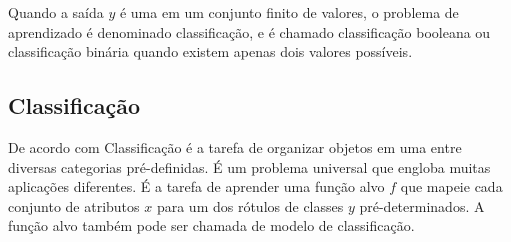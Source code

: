 Quando a saída \(y\) é uma em um conjunto finito de valores, o problema de
aprendizado é denominado classificação, e é chamado classificação booleana ou
classificação binária quando existem apenas dois valores
possíveis\cite{russell2011artificial}.

\subsection{Classificação}

De acordo com  Classificação é a tarefa de
organizar objetos em uma entre diversas categorias pré-definidas. É um problema
universal que engloba muitas aplicações diferentes. É a tarefa de aprender uma
função alvo \(f\) que mapeie cada conjunto de atributos \(x\) para um dos
rótulos de classes \(y\) pré-determinados. A função alvo também pode ser chamada
de modelo de classificação.

